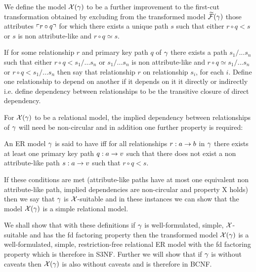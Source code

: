 We define the model $\mathcal{X}(\gamma)$ to be a further improvement to the first-cut transformation obtained by excluding  from  the transformed model $\mathcal{\widetilde{F}}(\gamma)$ those attributes $\left\ulcorner r \circ q\right\urcorner$ for which there exists a unique  path $s$ such that  either  $r \circ q < s$ or $s$ is non attribute-like and $r \circ q \simeq s$. 

\begin{definition}
If for some relationship $r$ and primary key path $q$ of $\gamma$ there exists a  path $s_1/...s_n$ such that either   $r \circ q < s_1/...s_n$ or $s_1/...s_n$ is non attribute-like and $r \circ q \simeq s_1/...s_n$ or $r \circ q < s_1/...s_n$ then say that relationship $r$  on relationship $s_i$,
for each $i$. Define one relationship to depend on another if it depends on it it directly or indirectly i.e. define dependency between relationships to be the transitive closure of direct dependency.
\end{definition}

For $\mathcal{X}(\gamma)$ to be a relational model, the implied dependency between relationships of $\gamma$ will need be non-circular
and in addition one further property is required:

\begin{definition}
An ER model $\gamma$ is said to have  iff for all relationships $r: a \rightarrow b$ in $\gamma$ there exists at least
one primary key path $q:a \rightarrow v$ such that there does not exist a non attribute-like path $s:a \rightarrow v$ such that
$r \circ q < s$.
\end{definition}

If these conditions are met (attribute-like paths have at most one equivalent non attribute-like path, implied dependencies are non-circular and property X holds) then we say that $\gamma$ is $\mathcal{X}$-suitable and in these instances we can show that 
the model $\mathcal{X}(\gamma)$ is a simple relational model. 

We shall show that with these definitions if $\gamma$ is well-formulated, simple, $\mathcal{X}$-suitable and has the fd factoring property
then the transformed model $\mathcal{X}(\gamma)$ is a well-formulated, simple, restriction-free relational ER model with the fd factoring property which is therefore in S3NF.  Further we will show that if $\gamma$ is without caveats then $\mathcal{X}(\gamma)$ is also without caveats and is therefore in BCNF. 

